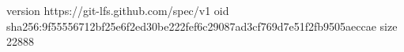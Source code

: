 version https://git-lfs.github.com/spec/v1
oid sha256:9f55556712bf25e6f2ed30be222fef6c29087ad3cf769d7e51f2fb9505aeccae
size 22888
